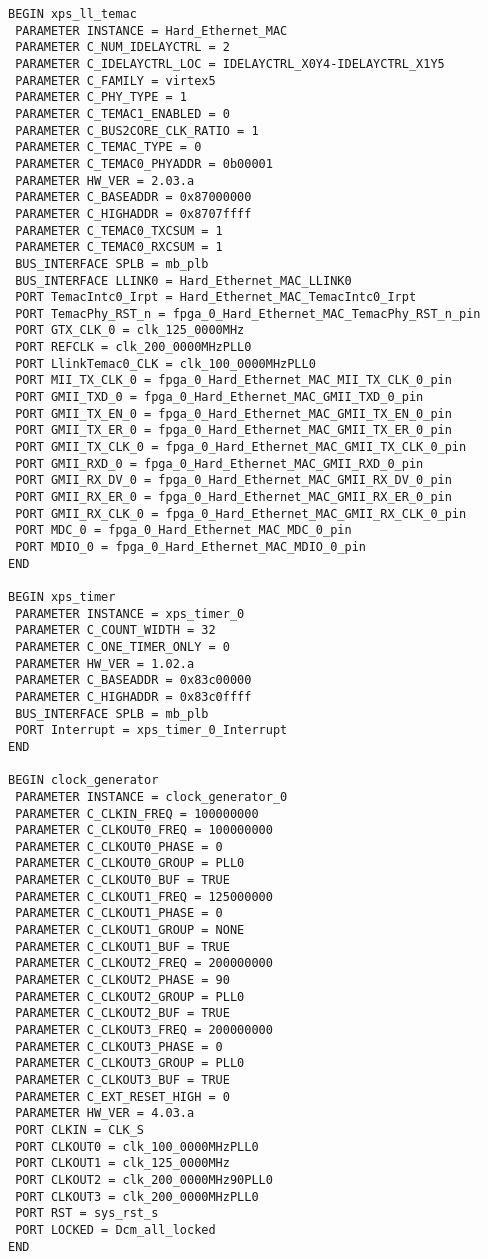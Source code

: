 \begin{verbatim}
BEGIN xps_ll_temac
 PARAMETER INSTANCE = Hard_Ethernet_MAC
 PARAMETER C_NUM_IDELAYCTRL = 2
 PARAMETER C_IDELAYCTRL_LOC = IDELAYCTRL_X0Y4-IDELAYCTRL_X1Y5
 PARAMETER C_FAMILY = virtex5
 PARAMETER C_PHY_TYPE = 1
 PARAMETER C_TEMAC1_ENABLED = 0
 PARAMETER C_BUS2CORE_CLK_RATIO = 1
 PARAMETER C_TEMAC_TYPE = 0
 PARAMETER C_TEMAC0_PHYADDR = 0b00001
 PARAMETER HW_VER = 2.03.a
 PARAMETER C_BASEADDR = 0x87000000
 PARAMETER C_HIGHADDR = 0x8707ffff
 PARAMETER C_TEMAC0_TXCSUM = 1
 PARAMETER C_TEMAC0_RXCSUM = 1
 BUS_INTERFACE SPLB = mb_plb
 BUS_INTERFACE LLINK0 = Hard_Ethernet_MAC_LLINK0
 PORT TemacIntc0_Irpt = Hard_Ethernet_MAC_TemacIntc0_Irpt
 PORT TemacPhy_RST_n = fpga_0_Hard_Ethernet_MAC_TemacPhy_RST_n_pin
 PORT GTX_CLK_0 = clk_125_0000MHz
 PORT REFCLK = clk_200_0000MHzPLL0
 PORT LlinkTemac0_CLK = clk_100_0000MHzPLL0
 PORT MII_TX_CLK_0 = fpga_0_Hard_Ethernet_MAC_MII_TX_CLK_0_pin
 PORT GMII_TXD_0 = fpga_0_Hard_Ethernet_MAC_GMII_TXD_0_pin
 PORT GMII_TX_EN_0 = fpga_0_Hard_Ethernet_MAC_GMII_TX_EN_0_pin
 PORT GMII_TX_ER_0 = fpga_0_Hard_Ethernet_MAC_GMII_TX_ER_0_pin
 PORT GMII_TX_CLK_0 = fpga_0_Hard_Ethernet_MAC_GMII_TX_CLK_0_pin
 PORT GMII_RXD_0 = fpga_0_Hard_Ethernet_MAC_GMII_RXD_0_pin
 PORT GMII_RX_DV_0 = fpga_0_Hard_Ethernet_MAC_GMII_RX_DV_0_pin
 PORT GMII_RX_ER_0 = fpga_0_Hard_Ethernet_MAC_GMII_RX_ER_0_pin
 PORT GMII_RX_CLK_0 = fpga_0_Hard_Ethernet_MAC_GMII_RX_CLK_0_pin
 PORT MDC_0 = fpga_0_Hard_Ethernet_MAC_MDC_0_pin
 PORT MDIO_0 = fpga_0_Hard_Ethernet_MAC_MDIO_0_pin
END

BEGIN xps_timer
 PARAMETER INSTANCE = xps_timer_0
 PARAMETER C_COUNT_WIDTH = 32
 PARAMETER C_ONE_TIMER_ONLY = 0
 PARAMETER HW_VER = 1.02.a
 PARAMETER C_BASEADDR = 0x83c00000
 PARAMETER C_HIGHADDR = 0x83c0ffff
 BUS_INTERFACE SPLB = mb_plb
 PORT Interrupt = xps_timer_0_Interrupt
END

BEGIN clock_generator
 PARAMETER INSTANCE = clock_generator_0
 PARAMETER C_CLKIN_FREQ = 100000000
 PARAMETER C_CLKOUT0_FREQ = 100000000
 PARAMETER C_CLKOUT0_PHASE = 0
 PARAMETER C_CLKOUT0_GROUP = PLL0
 PARAMETER C_CLKOUT0_BUF = TRUE
 PARAMETER C_CLKOUT1_FREQ = 125000000
 PARAMETER C_CLKOUT1_PHASE = 0
 PARAMETER C_CLKOUT1_GROUP = NONE
 PARAMETER C_CLKOUT1_BUF = TRUE
 PARAMETER C_CLKOUT2_FREQ = 200000000
 PARAMETER C_CLKOUT2_PHASE = 90
 PARAMETER C_CLKOUT2_GROUP = PLL0
 PARAMETER C_CLKOUT2_BUF = TRUE
 PARAMETER C_CLKOUT3_FREQ = 200000000
 PARAMETER C_CLKOUT3_PHASE = 0
 PARAMETER C_CLKOUT3_GROUP = PLL0
 PARAMETER C_CLKOUT3_BUF = TRUE
 PARAMETER C_EXT_RESET_HIGH = 0
 PARAMETER HW_VER = 4.03.a
 PORT CLKIN = CLK_S
 PORT CLKOUT0 = clk_100_0000MHzPLL0
 PORT CLKOUT1 = clk_125_0000MHz
 PORT CLKOUT2 = clk_200_0000MHz90PLL0
 PORT CLKOUT3 = clk_200_0000MHzPLL0
 PORT RST = sys_rst_s
 PORT LOCKED = Dcm_all_locked
END


\end{verbatim}
